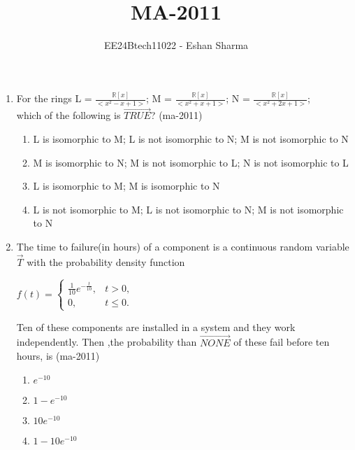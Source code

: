 \documentclass[journal,12pt,onecolumn]{IEEEtran}
\theoremstyle{remark}
\begin{document}

\vspace{3cm}

\title{MA-2011}
\author{EE24Btech11022 - Eshan Sharma}
\maketitle

\renewcommand{\thefigure}{\theenumi}
\renewcommand{\thetable}{\theenumi}



\begin{enumerate}
    \item For the rings L = $\frac{\mathbb{R}[x]}{<x^{2}-x+1>}$; M = $\frac{\mathbb{R}[x]}{<x^{2}+x+1>}$; N = $\frac{\mathbb{R}[x]}{<x^{2}+2x+1>}$;\\
    which of the following is $\vec{TRUE}$?
    \hfill{(ma-2011)}
    \begin{enumerate}
    \item L is isomorphic to M; L is not isomorphic to N; M is not isomorphic to N
    \item M is isomorphic to N; M is not isomorphic to L; N is not isomorphic to L
    \item L is isomorphic to M; M is isomorphic to N
    \item L is not isomorphic to M; L is not isomorphic to N; M is not isomorphic to N
    \end{enumerate} 
    \item The time to failure(in hours) of a component is a continuous random variable $\vec{T}$ with the probability density function\\
    \begin{center}
    $
    f(t) = 
    \begin{cases} 
    	\frac{1}{10} e^{-\frac{t}{10}}, & t > 0, \\
    	0, & t \leq 0.
    \end{cases}
    $
	\end{center}
	Ten of these components are installed in a system and they work independently. Then ,the probability than $\vec{NONE}$ of these fail before ten hours, is
    \hfill{(ma-2011)}
    \begin{multicols}{4}
    \begin{enumerate}
    \item $e^{-10}$
    \item $1-e^{-10}$
    \item $10e^{-10}$
    \item $1-10e^{-10}$

\end{enumerate}
\end{multicols}
\end{enumerate}
\end{document}

